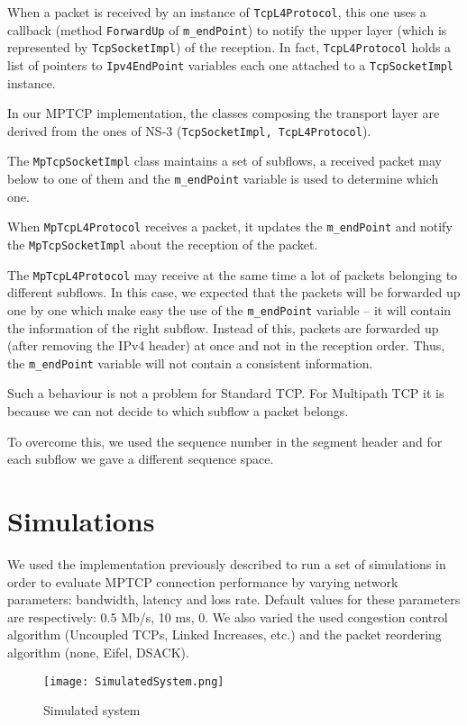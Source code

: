 \documentclass{sig-alternate}
\begin{document}
When a packet is received by an instance of {\tt TcpL4Protocol}, this one uses a callback (method {\tt ForwardUp} of {\tt m\_endPoint}) to notify the upper layer (which is represented by {\tt TcpSocketImpl}) of the reception. In fact, {\tt TcpL4Protocol} holds a list of pointers to {\tt Ipv4EndPoint} variables each one attached to a {\tt TcpSocketImpl} instance.

In our MPTCP implementation, the classes composing the transport layer are derived from the ones of NS-3 ({\tt TcpSocketImpl, TcpL4Protocol}). 

The {\tt MpTcpSocketImpl} class maintains a set of subflows, a received packet may below to one of them and the {\tt m\_endPoint} variable is used to determine which one. 

When {\tt MpTcpL4Protocol} receives a packet, it updates the {\tt m\_endPoint} and notify the {\tt MpTcpSocketImpl} about the reception of the packet. 

The {\tt MpTcpL4Protocol} may receive at the same time a lot of packets belonging to different subflows. In this case, we expected that the packets will be forwarded up one by one which make easy the use of the {\tt m\_endPoint} variable -- it will contain the information of the right subflow. Instead of this, packets are forwarded up (after removing the IPv4 header) at once and not in the reception order. Thus, the {\tt m\_endPoint} variable will not contain a consistent information. 

Such a behaviour is not a problem for Standard TCP. For Multipath TCP it is because we can not decide to which subflow a packet belongs.

To overcome this, we used the sequence number in the segment header and for each subflow we gave a different sequence space.


\section{Simulations}\label{sec:simulation}
We used the implementation previously described to run a set of simulations in order to evaluate MPTCP connection performance by varying network parameters: bandwidth, latency and loss rate. Default values for these parameters are respectively: 0.5 Mb/s, 10 ms, 0. 
We also varied the used congestion control algorithm (Uncoupled TCPs, Linked Increases, etc.) and the packet reordering algorithm (none, Eifel, DSACK). 

\begin{figure}[h]
\centering
\texttt{[image: SimulatedSystem.png]} 
\caption{Simulated system}
\label{simulation}
\end{figure} 
\end{document}
